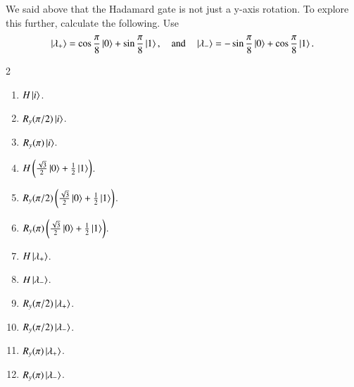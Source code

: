\begin{exercise}
We said above that the Hadamard gate is not just a y-axis rotation.  To explore this further, calculate the following. Use
\begin{equation}
    \ket{\lambda_{+}} = \cos\frac{\pi}{8}\ket{0}+\sin\frac{\pi}{8}\ket{1}, \quad\text{and}\quad\ket{\lambda_{-}} = -\sin\frac{\pi}{8}\ket{0}+\cos\frac{\pi}{8}\ket{1}.
\end{equation}
\begin{multicols}{2}
\begin{enumerate}[label=(\alph*)]
    \item $H\left| i \right\rangle$.
    \item $R_y(\pi/2)\left| i \right\rangle$.
    \item $R_y(\pi)\left| i \right\rangle$.
    \item $H\left(\frac{\sqrt{3}}{2}\left| 0 \right\rangle+\frac{1}{2}\left| 1 \right\rangle\right)$.
    \item $R_y(\pi/2)\left(\frac{\sqrt{3}}{2}\left| 0 \right\rangle+\frac{1}{2}\left| 1 \right\rangle\right)$.
    \item $R_y(\pi)\left(\frac{\sqrt{3}}{2}\left| 0 \right\rangle+\frac{1}{2}\left| 1 \right\rangle\right)$.
    \item $H\left| \lambda_+ \right\rangle$.
    \item $H\left| \lambda_- \right\rangle$.
    \item $R_y(\pi/2)\left| \lambda_+ \right\rangle$.
    \item $R_y(\pi/2)\left| \lambda_- \right\rangle$.
    \item $R_y(\pi)\left| \lambda_+ \right\rangle$.
    \item $R_y(\pi)\left| \lambda_- \right\rangle$.
\end{enumerate}
\end{multicols}
\end{exercise}
